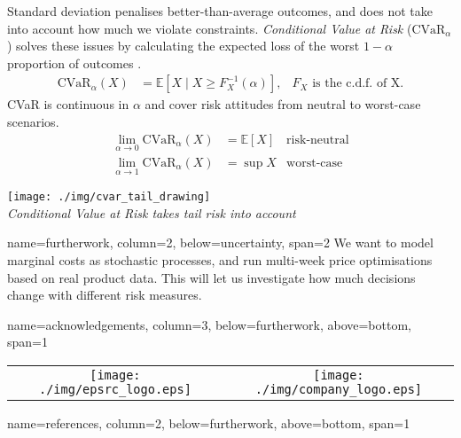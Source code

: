 \documentclass[a0paper,landscape,fontscale=0.35]{baposter}
\newcommand{\mycaption}[1]{
  {
    \smaller
    \emph{#1}
  }
}
\begin{document}
\begin{poster}
{  \begin{minipage}[h]{0.7\textwidth}
    Standard deviation penalises better-than-average outcomes, and
    does not take into account how much we violate constraints.
    \emph{Conditional Value at Risk} ($\mbox{CVaR}_\alpha$) solves these issues by
    calculating the expected loss of the worst $1-\alpha$ proportion
    of outcomes \citep{rockafellar2007coherent}.
    \begin{align}
      \mbox{CVaR}_\alpha(X) &= \mathbb E[X\mid X\geq F_X^{-1}(\alpha)],
      & F_X \text{~is the c.d.f.~of X.}
    \end{align}
    CVaR is continuous in $\alpha$ and cover risk attitudes from
    neutral to worst-case scenarios.
    \begin{align}
      \lim_{\alpha\to0}\mbox{CVaR}_\alpha(X)&=\mathbb E[X]
      & \text{risk-neutral}\\
      \lim_{\alpha\to1}\mbox{CVaR}_\alpha(X) &= \sup X
      & \text{worst-case}
    \end{align}
  \end{minipage}%
  \begin{minipage}[h]{0.3\textwidth}
    \centering
    \texttt{[image: ./img/cvar\_tail\_drawing]}\\
    \mycaption{Conditional Value at Risk takes tail risk into account}
  \end{minipage}
}

{name=furtherwork, column=2, below=uncertainty, span=2}
{
  We want to model marginal costs as stochastic processes, and run
  multi-week price optimisations based on real product data.
  This will let us investigate how much decisions change with different
  risk measures.
}

{name=acknowledgements, column=3, below=furtherwork, above=bottom, span=1}
{
    \vspace{1em}
    \begin{center}
      \begin{tabular}{cc}
        \texttt{[image: ./img/epsrc\_logo.eps]}
        &
          \texttt{[image: ./img/company\_logo.eps]}
      \end{tabular}
    \end{center}
}

{name=references, column=2, below=furtherwork, above=bottom, span=1}
{
  \smaller                                  %
  \renewcommand{\section}[2]{\vspace{0.05em}}	%
  
}

\end{poster}
\end{document}
